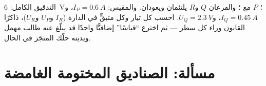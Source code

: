 \begin{exercise}[$\star\star\star$]\label{exo:g8:circuit-laws:12}
التدقيق الكامل:  \qty{6}{V}؛  $P$ 
مع ؛ والفرعان $Q$ و$R$ يلتئمان ويعودان. والمقيس:
$I_P = \qty{0.6}{A}$، و$I_Q = \qty{0.45}{A}$،
و$U_Q = \qty{2.3}{V}$. احسب كل تيار وكل  متبقٍّ في الدارة
($I_R$ و$U_P$ و$U_R$)، ذاكرًا القانون وراء كل سطر --- ثم اخترع
``قياسًا'' إضافيًّا واحدًا قد يبلّغ عنه طالب مهمل ويدينه حلّك
المنجَز في الحال.
\end{exercise}

\section{مسألة: الصناديق المختومة الغامضة}

